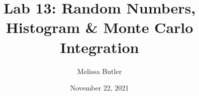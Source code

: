 \newcommand{\course}{MATH 3341}
\title{Lab 13: Random Numbers, Histogram \& Monte Carlo Integration}
\author{Melissa Butler}
\date{November 22, 2021}
